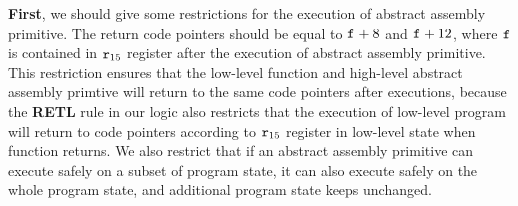 \begin{definition}
\begin{enumerate}
    \end{enumerate}
\end{definition}

\textbf{First}, we should give some restrictions 
for the execution of abstract assembly primitive. 
The return code pointers should be equal to 
$\texttt{f}_{}+8$ and $\texttt{f}_{}+12$, where $\texttt{f}_{}$ 
is contained in $\texttt{r}_{15}$ register after the execution 
of abstract assembly primitive.  
This restriction ensures that the low-level function 
and high-level abstract assembly primtive will return to 
the same code pointers after executions, because
the \textbf{RETL} rule in our logic also restricts 
that the execution of low-level program will return to 
code pointers according to $\texttt{r}_{15}$ register 
in low-level state when function returns. 
We also restrict that 
if an abstract assembly primitive 
can execute safely on a subset of program state, 
it can also execute safely on the whole program state, 
and additional program state keeps unchanged.  
